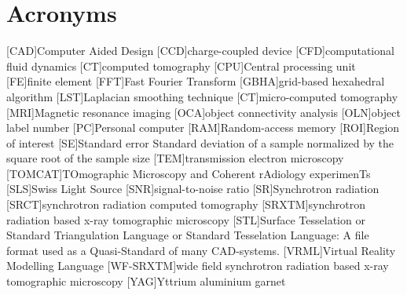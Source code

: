     \chapter*{Acronyms}
    \begin{acronym}
		[CAD]{Computer Aided Design}
		[CCD]{charge-coupled device}
		[CFD]{computational fluid dynamics}
		[CT]{computed tomography}
		[CPU]{Central processing unit}
		[FE]{finite element}
		[FFT]{Fast Fourier Transform}
		{grid-based hexahedral algorithm}
		[LST]{Laplacian smoothing technique}
		[\micro CT]{micro-computed tomography}
		[MRI]{Magnetic resonance imaging}
		[OCA]{object connectivity analysis}
		[OLN]{object label number}
		[PC]{Personal computer}
		[RAM]{Random-access memory}
		[ROI]{Region of interest}
		[SE]{Standard error} Standard deviation of a sample normalized by the square root of the sample size
		[TEM]{transmission electron microscopy}
		[TOMCAT]{TOmographic Microscopy and Coherent rAdiology experimenTs}
		[SLS]{Swiss Light Source}
		[SNR]{signal-to-noise ratio}
		[SR]{Synchrotron radiation}
		{synchrotron radiation computed tomography}
		[SRXTM]{synchrotron radiation based x-ray tomographic microscopy}
		[STL]{Surface Tesselation or Standard Triangulation Language or Standard Tesselation Language}: A file format used as a Quasi-Standard of many \acs{CAD}-systems.
		{Virtual Reality Modelling Language}
		[WF-SRXTM]{wide field synchrotron radiation based x-ray tomographic microscopy}
		[YAG]{Yttrium aluminium garnet}
    \end{acronym}                     
\endgroup

\cleardoublepage
